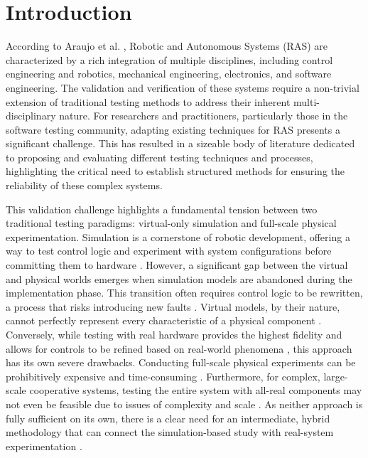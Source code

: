 \chapter{Introduction} \label{chap:introduction}

According to Araujo et al. \cite{AMV23}, Robotic and Autonomous Systems (RAS) are characterized by a rich integration of multiple disciplines, including control engineering and robotics, mechanical engineering, electronics, and software engineering. The validation and verification of these systems require a non-trivial extension of traditional testing methods to address their inherent multi-disciplinary nature. For researchers and practitioners, particularly those in the software testing community, adapting existing techniques for RAS presents a significant challenge. This has resulted in a sizeable body of literature dedicated to proposing and evaluating different testing techniques and processes, highlighting the critical need to establish structured methods for ensuring the reliability of these complex systems.

This validation challenge highlights a fundamental tension between two traditional testing paradigms: virtual-only simulation and full-scale physical experimentation. Simulation is a cornerstone of robotic development, offering a way to test control logic and experiment with system configurations before committing them to hardware \cite{Hu05}. However, a significant gap between the virtual and physical worlds emerges when simulation models are abandoned during the implementation phase. This transition often requires control logic to be rewritten, a process that risks introducing new faults \cite{Hu05}. Virtual models, by their nature, cannot perfectly represent every characteristic of a physical component \cite{Hu05}. Conversely, while testing with real hardware provides the highest fidelity and allows for controls to be refined based on real-world phenomena \cite{Hu05}, this approach has its own severe drawbacks. Conducting full-scale physical experiments can be prohibitively expensive and time-consuming \cite{Hu05}. Furthermore, for complex, large-scale cooperative systems, testing the entire system with all-real components may not even be feasible due to issues of complexity and scale \cite{Hu05}. As neither approach is fully sufficient on its own, there is a clear need for an intermediate, hybrid methodology that can connect the simulation-based study with real-system experimentation \cite{Hu05}.

